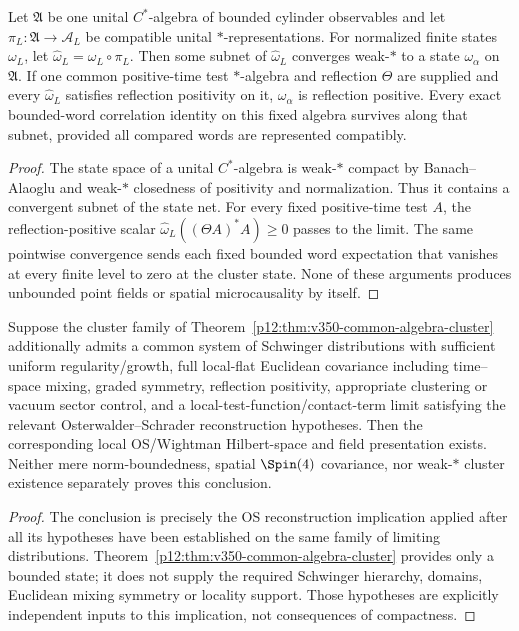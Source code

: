 \documentclass[12pt,a4paper]{article}
\begin{document}
\begin{theorem}
\label{p12:thm:v350-common-algebra-cluster}
Let $\mathfrak A$ be one unital $C^*$-algebra of bounded cylinder
observables and let $\pi_L:\mathfrak A\to\mathcal A_L$ be
compatible unital $*$-representations. For normalized finite
states $\omega_L$, let $\widehat\omega_L=\omega_L\circ\pi_L$.
Then some subnet of $\widehat\omega_L$ converges weak-$*$ to a
state $\omega_\alpha$ on $\mathfrak A$.
If one common positive-time test $*$-algebra and reflection
$\Theta$ are supplied and every $\widehat\omega_L$ satisfies
reflection positivity on it, $\omega_\alpha$ is reflection
positive. Every exact bounded-word correlation identity on
this fixed algebra survives along that subnet, provided
all compared words are represented compatibly.
\end{theorem}
\begin{proof}
The state space of a unital $C^*$-algebra is weak-$*$ compact
by Banach--Alaoglu and weak-$*$ closedness of positivity and
normalization. Thus it contains a convergent subnet of the
state net. For every fixed positive-time test $A$, the
reflection-positive scalar
$\widehat\omega_L((\Theta A)^*A)\ge0$ passes to the limit.
The same pointwise convergence sends each fixed bounded
word expectation that vanishes at every finite level to
zero at the cluster state. None of these arguments produces
unbounded point fields or spatial microcausality by itself.
\end{proof}

\begin{theorem}
\label{p12:thm:v350-os-conditional-bridge}
Suppose the cluster family of
Theorem~\ref{p12:thm:v350-common-algebra-cluster}
additionally admits a common system of Schwinger distributions
with sufficient uniform regularity/growth, full local-flat
Euclidean covariance including time--space mixing, graded
symmetry, reflection positivity, appropriate clustering or
vacuum sector control, and a local-test-function/contact-term
limit satisfying the relevant Osterwalder--Schrader
reconstruction hypotheses. Then the corresponding local
OS/Wightman Hilbert-space and field presentation exists.
Neither mere norm-boundedness, spatial $\Spin(4)$ covariance,
nor weak-$*$ cluster existence separately proves this conclusion.
\end{theorem}
\begin{proof}
The conclusion is precisely the OS reconstruction implication
applied after all its hypotheses have been established on the
same family of limiting distributions. Theorem~\ref{p12:thm:v350-common-algebra-cluster}
provides only a bounded state; it does not supply the required
Schwinger hierarchy, domains, Euclidean mixing symmetry or
locality support. Those hypotheses are explicitly independent
inputs to this implication, not consequences of compactness.
\end{proof}
\end{document}
